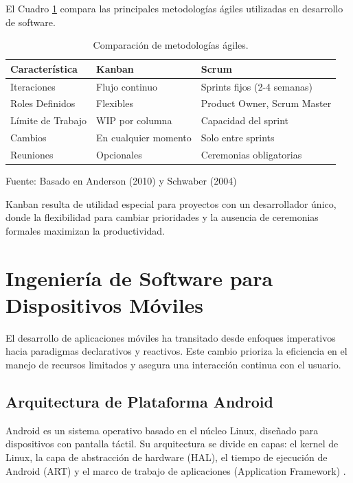El Cuadro \ref{tab:metodologia_comparison} compara las principales metodologías ágiles utilizadas en desarrollo de software.

\begin{table}[H]
\centering
\begin{tabularx}{\linewidth}{p{3.5cm} p{4.5cm} p{4.5cm}}
\toprule
Característica & Kanban & Scrum \\
\midrule
Iteraciones & Flujo continuo & Sprints fijos (2-4 semanas) \\
Roles Definidos & Flexibles & Product Owner, Scrum Master \\
Límite de Trabajo & WIP por columna & Capacidad del sprint \\
Cambios & En cualquier momento & Solo entre sprints \\
Reuniones & Opcionales & Ceremonias obligatorias \\
\bottomrule
\end{tabularx}
\caption{Comparación de metodologías ágiles.}\label{tab:metodologia_comparison}
Fuente: Basado en Anderson (2010) \cite{kanban_anderson} y Schwaber (2004) \cite{scrum_schwaber}
\end{table}

Kanban resulta de utilidad especial para proyectos con un desarrollador único, donde la flexibilidad para cambiar prioridades y la ausencia de ceremonias formales maximizan la productividad.

\section{Ingeniería de Software para Dispositivos Móviles}
\label{sec:ingenieria-movil}

El desarrollo de aplicaciones móviles ha transitado desde enfoques imperativos hacia paradigmas declarativos y reactivos. Este cambio prioriza la eficiencia en el manejo de recursos limitados y asegura una interacción continua con el usuario.

\subsection{Arquitectura de Plataforma Android}
Android es un sistema operativo basado en el núcleo Linux, diseñado para dispositivos con pantalla táctil. Su arquitectura se divide en capas: el kernel de Linux, la capa de abstracción de hardware (HAL), el tiempo de ejecución de Android (ART) y el marco de trabajo de aplicaciones (Application Framework) \cite{android_arch}.

